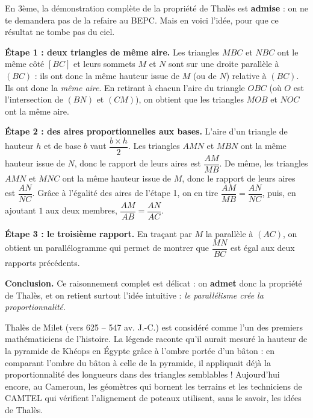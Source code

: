 \documentclass[11pt]{article}
\begin{document}
\begin{experience}
En 3ème, la démonstration complète de la propriété de Thalès est \textbf{admise} : on ne te demandera pas de la refaire au BEPC. Mais en voici l'idée, pour que ce résultat ne tombe pas du ciel.

\textbf{Étape 1 : deux triangles de même aire.} Les triangles $MBC$ et $NBC$ ont le même côté $[BC]$ et leurs sommets $M$ et $N$ sont sur une droite parallèle à $(BC)$ : ils ont donc la même hauteur issue de $M$ (ou de $N$) relative à $(BC)$. Ils ont donc la \emph{même aire}. En retirant à chacun l'aire du triangle $OBC$ (où $O$ est l'intersection de $(BN)$ et $(CM)$), on obtient que les triangles $MOB$ et $NOC$ ont la même aire.

\textbf{Étape 2 : des aires proportionnelles aux bases.} L'aire d'un triangle de hauteur $h$ et de base $b$ vaut $\dfrac{b \times h}{2}$. Les triangles $AMN$ et $MBN$ ont la même hauteur issue de $N$, donc le rapport de leurs aires est $\dfrac{AM}{MB}$. De même, les triangles $AMN$ et $MNC$ ont la même hauteur issue de $M$, donc le rapport de leurs aires est $\dfrac{AN}{NC}$. Grâce à l'égalité des aires de l'étape 1, on en tire $\dfrac{AM}{MB} = \dfrac{AN}{NC}$, puis, en ajoutant $1$ aux deux membres, $\dfrac{AM}{AB} = \dfrac{AN}{AC}$.

\textbf{Étape 3 : le troisième rapport.} En traçant par $M$ la parallèle à $(AC)$, on obtient un parallélogramme qui permet de montrer que $\dfrac{MN}{BC}$ est égal aux deux rapports précédents.

\textbf{Conclusion.} Ce raisonnement complet est délicat : on \textbf{admet} donc la propriété de Thalès, et on retient surtout l'idée intuitive : \emph{le parallélisme crée la proportionnalité}.
\end{experience}

\begin{savaistu}
Thalès de Milet (vers 625 -- 547 av. J.-C.) est considéré comme l'un des premiers mathématiciens de l'histoire. La légende raconte qu'il aurait mesuré la hauteur de la pyramide de Khéops en Égypte grâce à l'ombre portée d'un bâton : en comparant l'ombre du bâton à celle de la pyramide, il appliquait déjà la proportionnalité des longueurs dans des triangles semblables ! Aujourd'hui encore, au Cameroun, les géomètres qui bornent les terrains et les techniciens de CAMTEL qui vérifient l'alignement de poteaux utilisent, sans le savoir, les idées de Thalès.
\end{savaistu}
\end{document}
